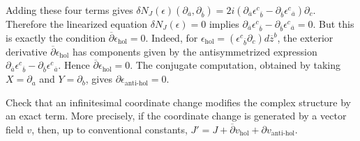 \documentclass[12pt]{article}
\begin{document}
\begin{solution}
    Adding these four terms gives $\delta N_J(\epsilon)(\partial_{\overline a},\partial_{\overline b})=2i(\partial_{\overline a}\epsilon^c{}_{\overline b}-\partial_{\overline b}\epsilon^c{}_{\overline a})\partial_c$. Therefore the linearized equation $\delta N_J(\epsilon)=0$ implies $\partial_{\overline a}\epsilon^c{}_{\overline b}-\partial_{\overline b}\epsilon^c{}_{\overline a}=0$.
    But this is exactly the condition $\overline\partial\epsilon_{\mathrm{hol}}=0$. Indeed, for $\epsilon_{\mathrm{hol}}=(\epsilon^c{}_{\overline b}\partial_c)d\overline z^b$, the exterior derivative $\overline\partial\epsilon_{\mathrm{hol}}$ has components given by the antisymmetrized expression $\partial_{\overline a}\epsilon^c{}_{\overline b}-\partial_{\overline b}\epsilon^c{}_{\overline a}$. Hence $\overline\partial\epsilon_{\mathrm{hol}}=0$.
    The conjugate computation, obtained by taking $X=\partial_a$ and $Y=\partial_b$, gives $\partial\epsilon_{\mathrm{anti\text{-}hol}}=0$.
\end{solution}
\begin{exercise}
    Check that an infinitesimal coordinate change modifies the complex structure by an exact term. More precisely, if the coordinate change is generated by a vector field $v$, then, up to conventional constants, $J'=J+\overline\partial v_{\mathrm{hol}}+\partial v_{\mathrm{anti\text{-}hol}}$.
\end{exercise}
\end{document}
